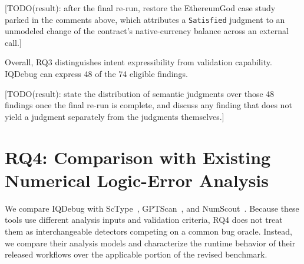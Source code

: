 \documentclass[11pt,oneside]{report}
\theoremstyle{plain}
\theoremstyle{definition}
\theoremstyle{remark}
\begin{document}
[TODO(result): after the final re-run, restore the EthereumGod case study
parked in the comments above, which attributes a \texttt{Satisfied} judgment to
an unmodeled change of the contract's native-currency balance across an
external call.]

Overall, RQ3 distinguishes intent expressibility from validation capability.
IQDebug can express 48 of the 74 eligible findings.

[TODO(result): state the distribution of semantic judgments over those 48
findings once the final re-run is complete, and discuss any finding that does
not yield a judgment separately from the judgments themselves.]



\section{RQ4: Comparison with Existing Numerical Logic-Error Analysis}\label{sec:eval:rq4}

We compare IQDebug with ScType~\citep{sctype},
GPTScan~\citep{gptscan}, and NumScout~\citep{numscout}.
Because these tools use different analysis inputs and validation criteria,
RQ4 does not treat them as interchangeable detectors competing on a common
bug oracle. Instead, we compare their analysis models and characterize the
runtime behavior of their released workflows over the applicable portion of
the revised benchmark.
\end{document}
